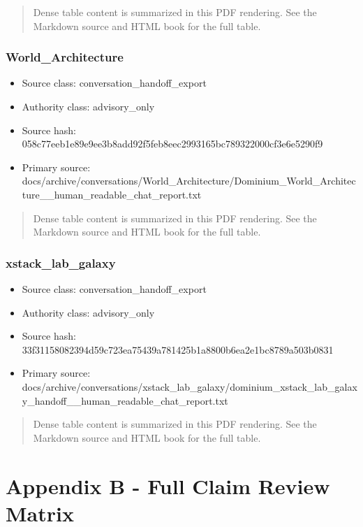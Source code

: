 \documentclass[11pt,a4paper]{report}
\begin{document}
\begin{quote}\small Dense table content is summarized in this PDF rendering. See the Markdown source and HTML book for the full table.\end{quote}

\subsection{World\_Architecture}

\begin{itemize}
\item Source class: conversation\_handoff\_export
\item Authority class: advisory\_only
\item Source hash: 058c77eeb1e89e9ee3b8add92f5feb8eec2993165bc789322000cf3e6e5290f9
\item Primary source: docs/archive/conversations/World\_Architecture/Dominium\_World\_Architecture\_\_human\_readable\_chat\_report.txt
\end{itemize}

\begin{quote}\small Dense table content is summarized in this PDF rendering. See the Markdown source and HTML book for the full table.\end{quote}

\subsection{xstack\_lab\_galaxy}

\begin{itemize}
\item Source class: conversation\_handoff\_export
\item Authority class: advisory\_only
\item Source hash: 33f31158082394d59c723ea75439a781425b1a8800b6ea2e1bc8789a503b0831
\item Primary source: docs/archive/conversations/xstack\_lab\_galaxy/dominium\_xstack\_lab\_galaxy\_handoff\_\_human\_readable\_chat\_report.txt
\end{itemize}

\begin{quote}\small Dense table content is summarized in this PDF rendering. See the Markdown source and HTML book for the full table.\end{quote}


\chapter{Appendix B - Full Claim Review Matrix}
\end{document}
